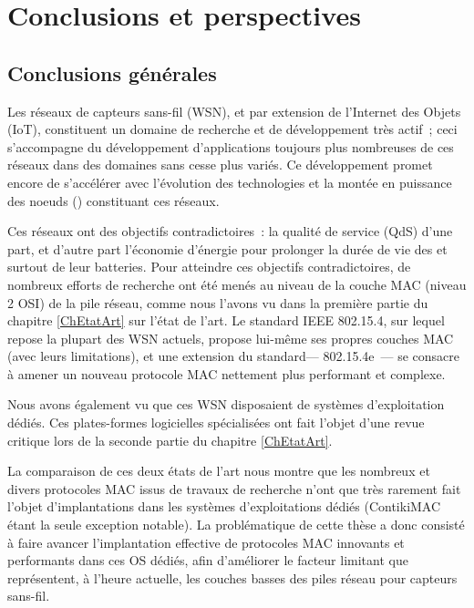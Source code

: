
\chapter{Conclusions et perspectives}
\label{ChConcluPerspec}


\section{Conclusions générales}
\label{SecConcluGene}

Les réseaux de capteurs sans-fil (WSN), et par extension de l'Internet des
Objets (IoT), constituent un domaine de recherche et de développement très
actif~; ceci s'accompagne du développement d'applications toujours plus
nombreuses de ces réseaux dans des domaines sans cesse plus variés.
Ce développement promet encore de s'accélérer avec l'évolution des
technologies et la montée en puissance des noeuds ()
constituant ces réseaux.

Ces réseaux ont des objectifs contradictoires~: la qualité de service
(QdS) d'une part, et d'autre part l'économie d'énergie pour prolonger
la durée de vie des  et surtout de leur batteries.
Pour atteindre ces objectifs contradictoires, de nombreux efforts de
recherche ont été menés au niveau de la couche MAC (niveau 2 OSI) de
la pile réseau, comme nous l'avons vu dans la première partie du
chapitre \ref{ChEtatArt} sur l'état de l'art. Le standard IEEE 802.15.4,
sur lequel repose la plupart des WSN actuels, propose lui-même ses propres
couches MAC (avec leurs limitations), et une extension du standard---
802.15.4e~--- se consacre à amener un nouveau protocole MAC nettement
plus performant et complexe.

Nous avons également vu que ces WSN disposaient de systèmes d'exploitation
dédiés. Ces plates-formes logicielles spécialisées ont fait l'objet d'une
revue critique lors de la seconde partie du chapitre \ref{ChEtatArt}.

La comparaison de ces deux états de l'art nous montre que les nombreux et
divers protocoles MAC issus de travaux de recherche n'ont que très rarement
fait l'objet d'implantations dans les systèmes d'exploitations dédiés
(ContikiMAC étant la seule exception notable). La problématique de cette
thèse a donc consisté à faire avancer l'implantation effective de protocoles
MAC innovants et performants dans ces OS dédiés, afin d'améliorer le facteur
limitant que représentent, à l'heure actuelle, les couches basses des piles
réseau pour capteurs sans-fil.

